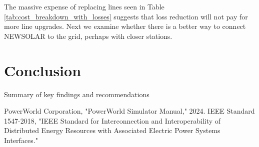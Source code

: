 \documentclass[conference]{IEEEtran}
\begin{document}
The massive expense of replacing lines seen in Table \ref{tab:cost_breakdown_with_losses} suggests that loss reduction will not pay for more line upgrades. Next we examine whether there is a better way to connect NEWSOLAR to the grid, perhaps with closer stations.
\section{Conclusion}
Summary of key findings and recommendations
	
\begin{thebibliography}{00}
	 PowerWorld Corporation, "PowerWorld Simulator Manual," 2024.
	 IEEE Standard 1547-2018, "IEEE Standard for Interconnection and Interoperability of Distributed Energy Resources with Associated Electric Power Systems Interfaces."
\end{thebibliography}
\end{document}
